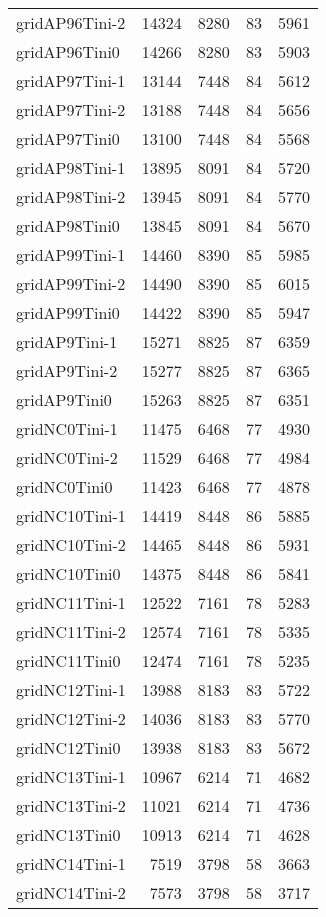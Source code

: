 \begin{longtable}{lrrrr}
gridAP96Tini-2 & 14324 & 8280 & 83 & 5961 \\
gridAP96Tini0 & 14266 & 8280 & 83 & 5903 \\
gridAP97Tini-1 & 13144 & 7448 & 84 & 5612 \\
gridAP97Tini-2 & 13188 & 7448 & 84 & 5656 \\
gridAP97Tini0 & 13100 & 7448 & 84 & 5568 \\
gridAP98Tini-1 & 13895 & 8091 & 84 & 5720 \\
gridAP98Tini-2 & 13945 & 8091 & 84 & 5770 \\
gridAP98Tini0 & 13845 & 8091 & 84 & 5670 \\
gridAP99Tini-1 & 14460 & 8390 & 85 & 5985 \\
gridAP99Tini-2 & 14490 & 8390 & 85 & 6015 \\
gridAP99Tini0 & 14422 & 8390 & 85 & 5947 \\
gridAP9Tini-1 & 15271 & 8825 & 87 & 6359 \\
gridAP9Tini-2 & 15277 & 8825 & 87 & 6365 \\
gridAP9Tini0 & 15263 & 8825 & 87 & 6351 \\
gridNC0Tini-1 & 11475 & 6468 & 77 & 4930 \\
gridNC0Tini-2 & 11529 & 6468 & 77 & 4984 \\
gridNC0Tini0 & 11423 & 6468 & 77 & 4878 \\
gridNC10Tini-1 & 14419 & 8448 & 86 & 5885 \\
gridNC10Tini-2 & 14465 & 8448 & 86 & 5931 \\
gridNC10Tini0 & 14375 & 8448 & 86 & 5841 \\
gridNC11Tini-1 & 12522 & 7161 & 78 & 5283 \\
gridNC11Tini-2 & 12574 & 7161 & 78 & 5335 \\
gridNC11Tini0 & 12474 & 7161 & 78 & 5235 \\
gridNC12Tini-1 & 13988 & 8183 & 83 & 5722 \\
gridNC12Tini-2 & 14036 & 8183 & 83 & 5770 \\
gridNC12Tini0 & 13938 & 8183 & 83 & 5672 \\
gridNC13Tini-1 & 10967 & 6214 & 71 & 4682 \\
gridNC13Tini-2 & 11021 & 6214 & 71 & 4736 \\
gridNC13Tini0 & 10913 & 6214 & 71 & 4628 \\
gridNC14Tini-1 & 7519 & 3798 & 58 & 3663 \\
gridNC14Tini-2 & 7573 & 3798 & 58 & 3717 \\

\end{longtable}
